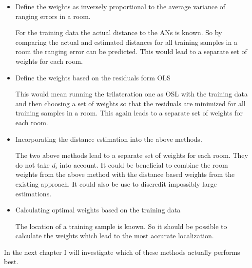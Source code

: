 \begin{itemize}
\item Define the weights as inversely proportional to the average variance of ranging errors in a room.

For the training data the actual distance to the ANs is known. So by comparing the actual and estimated distances for all training samples in a room the ranging error can be predicted. This would lead to a separate set of weights for each room.
\item Define the weights based on the residuals form OLS

This would mean running the trilateration one as OSL with the training data and then choosing a set of weights so that the residuals are minimized for all training samples in a room. This again leads to a separate set of weights for each room.
\item Incorporating the distance estimation into the above methods.

The two above methods lead to a separate set of weights for each room. They do not take \(d_i\) into account. It could be beneficial to combine the room weights from the above method with the distance based weights from the existing approach. It could also be use to discredit impossibly large estimations.
\item Calculating optimal weights based on the training data

The location of a training sample is known. So it should be possible to calculate the weights which lead to the most accurate localization. 
\end{itemize}

In the next chapter I will investigate which of these methods actually performs best.
